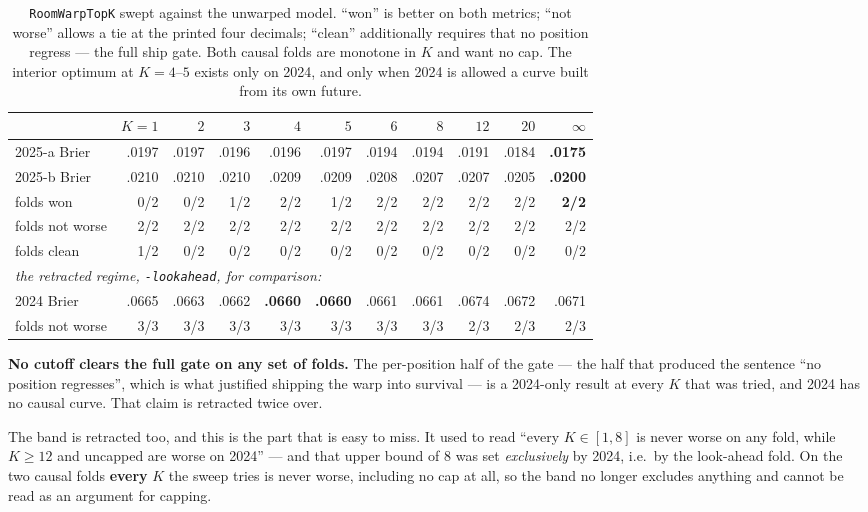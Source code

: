 \documentclass[10pt,a4paper]{article}
\theoremstyle{plain}
\theoremstyle{definition}
\theoremstyle{remark}
\newcommand{\code}[1]{\texttt{\small #1}}
\begin{document}
\begin{table}[htbp]
\centering
\small
\begin{tabular}{lrrrrrrrrrr}
\toprule
& $K{=}1$ & $2$ & $3$ & $4$ & $5$ & $6$ & $8$ & $12$ & $20$ & $\infty$ \\
\midrule
2025-a Brier & .0197 & .0197 & .0196 & .0196 & .0197 & .0194 & .0194 & .0191 & .0184 & \textbf{.0175} \\
2025-b Brier & .0210 & .0210 & .0210 & .0209 & .0209 & .0208 & .0207 & .0207 & .0205 & \textbf{.0200} \\
\midrule
folds won      & 0/2 & 0/2 & 1/2 & 2/2 & 1/2 & 2/2 & 2/2 & 2/2 & 2/2 & \textbf{2/2} \\
folds not worse& 2/2 & 2/2 & 2/2 & 2/2 & 2/2 & 2/2 & 2/2 & 2/2 & 2/2 & 2/2 \\
folds clean    & 1/2 & 0/2 & 0/2 & 0/2 & 0/2 & 0/2 & 0/2 & 0/2 & 0/2 & 0/2 \\
\midrule
\multicolumn{11}{l}{\emph{the retracted regime, \code{-lookahead}, for comparison:}} \\
2024 Brier   & .0665 & .0663 & .0662 & \textbf{.0660} & \textbf{.0660} & .0661 & .0661 & .0674 & .0672 & .0671 \\
folds not worse& 3/3 & 3/3 & 3/3 & 3/3 & 3/3 & 3/3 & 3/3 & 2/3 & 2/3 & 2/3 \\
\bottomrule
\end{tabular}
\caption{\code{RoomWarpTopK} swept against the unwarped model. ``won'' is better on both
metrics; ``not worse'' allows a tie at the printed four decimals; ``clean'' additionally
requires that no position regress --- the full ship gate. Both causal folds are monotone in
$K$ and want no cap. The interior optimum at $K = 4$--$5$ exists only on 2024, and only when
2024 is allowed a curve built from its own future.}
\label{tab:cutoffsweep}
\end{table}

\textbf{No cutoff clears the full gate on any set of folds.} The per-position half of the
gate --- the half that produced the sentence ``no position regresses'', which is what
justified shipping the warp into survival --- is a 2024-only result at every $K$ that was
tried, and 2024 has no causal curve. That claim is retracted twice over.

The band is retracted too, and this is the part that is easy to miss. It used to read
``every $K \in [1,8]$ is never worse on any fold, while $K \ge 12$ and uncapped are worse
on 2024'' --- and that upper bound of $8$ was set \emph{exclusively} by 2024, i.e.\ by the
look-ahead fold. On the two causal folds \textbf{every} $K$ the sweep tries is never worse,
including no cap at all, so the band no longer excludes anything and cannot be read as an
argument for capping.
\end{document}
